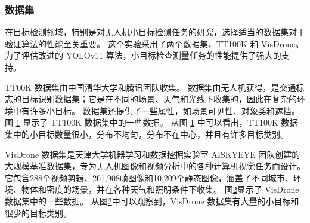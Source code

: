 \subsubsection{数据集}

在目标检测领域，特别是对无人机小目标检测任务的研究，选择适当的数据集对于验证算法的性能至关重要。
这个实验采用了两个数据集，TT100K 和 VisDrone。
为了评估改进的 YOLOv11 算法，小目标检查测量任务的性能提供了强大的支持。

TT00K 数据集由中国清华大学和腾讯团队收集。
数据集由无人机获得，是交通标志的目标识别数据集；它是在不同的场景、天气和光线下收集的，因此在复杂的环境中有许多小目标。
数据集还提供了一些属性，如场景可见性、对象类和遮挡。
图 \ref{fig:tt100k_figure} 显示了 TT100K 数据集中的一些数据。
从图 \ref{fig:tt100k_figure} 中可以看出，TT100K 数据集中的小目标数量很小，分布不均匀，分布不在中心，并且有许多目标类别。

\begin{figure}[htbp]
    \centering
    \captionsetup{font=footnotesize}
    \label{fig:tt100k_figure}
\end{figure}

VisDrone 数据集是天津大学机器学习和数据挖掘实验室 AISKYEYE 团队创建的大规模基准数据集，专为无人机图像和视频分析中的各种计算机视觉任务而设计。
它包含288个视频剪辑、261,908帧图像和10,209个静态图像，涵盖了不同城市、环境、物体和密度的场景，并在各种天气和照明条件下收集。
图\ref{fig:vd_figure}显示了 VisDrone 数据集中的一些数据。
从图\ref{fig:vd_figure}中可以观察到，VisDrone 数据集有大量的小目标和很少的目标类别。

\begin{figure}[h]
    \centering
    \captionsetup{font=footnotesize}
    \label{fig:vd_figure}
\end{figure}

